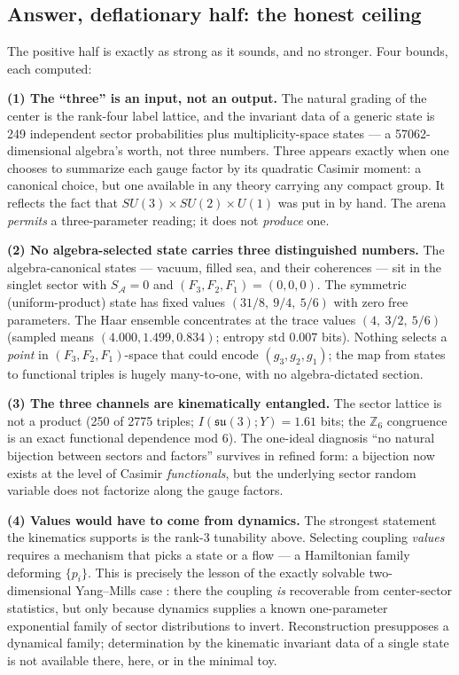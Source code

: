 \documentclass[11pt]{article}
\newcommand{\ZZ}{\mathbb{Z}}
\newcommand{\SA}{S_{\mathcal{A}}}
\newcommand{\su}[1]{\mathfrak{su}(#1)}
\begin{document}
\subsection{Answer, deflationary half: the honest ceiling}\label{sec:ceiling}

The positive half is exactly as strong as it sounds, and no stronger. Four bounds, each computed:

\textbf{(1) The ``three'' is an input, not an output.} The natural grading of the center is the rank-four label lattice, and the invariant data of a generic state is 249 independent sector probabilities plus multiplicity-space states --- a 57062-dimensional algebra's worth, not three numbers. Three appears exactly when one chooses to summarize each gauge factor by its quadratic Casimir moment: a canonical choice, but one available in any theory carrying any compact group. It reflects the fact that $SU(3)\times SU(2)\times U(1)$ was put in by hand. The arena \emph{permits} a three-parameter reading; it does not \emph{produce} one.

\textbf{(2) No algebra-selected state carries three distinguished numbers.} The algebra-canonical states --- vacuum, filled sea, and their coherences --- sit in the singlet sector with $\SA = 0$ and $(F_3,F_2,F_1) = (0,0,0)$. The symmetric (uniform-product) state has fixed values $(31/8,\ 9/4,\ 5/6)$ with zero free parameters. The Haar ensemble concentrates at the trace values $(4,\ 3/2,\ 5/6)$ (sampled means $(4.000, 1.499, 0.834)$; entropy std $0.007$ bits). Nothing selects a \emph{point} in $(F_3,F_2,F_1)$-space that could encode $(g_3,g_2,g_1)$; the map from states to functional triples is hugely many-to-one, with no algebra-dictated section.

\textbf{(3) The three channels are kinematically entangled.} The sector lattice is not a product (250 of 2775 triples; $I(\su3;Y) = 1.61$ bits; the $\ZZ_6$ congruence is an exact functional dependence mod 6). The one-ideal diagnosis ``no natural bijection between sectors and factors'' survives in refined form: a bijection now exists at the level of Casimir \emph{functionals}, but the underlying sector random variable does not factorize along the gauge factors.

\textbf{(4) Values would have to come from dynamics.} The strongest statement the kinematics supports is the rank-3 tunability above. Selecting coupling \emph{values} requires a mechanism that picks a state or a flow --- a Hamiltonian family deforming $\{p_i\}$. This is precisely the lesson of the exactly solvable two-dimensional Yang--Mills case \cite{ym2,donnelly12,donnelly14}: there the coupling \emph{is} recoverable from center-sector statistics, but only because dynamics supplies a known one-parameter exponential family of sector distributions to invert. Reconstruction presupposes a dynamical family; determination by the kinematic invariant data of a single state is not available there, here, or in the minimal toy.
\end{document}

